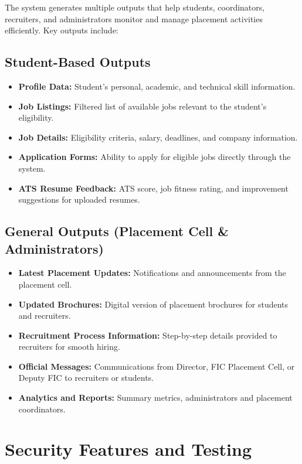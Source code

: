 \documentclass[14pt]{extarticle}
\begin{document}
The system generates multiple outputs that help students, coordinators, recruiters, and administrators monitor and manage placement activities efficiently. Key outputs include:

\subsection{Student-Based Outputs}
\begin{itemize}
    \item \textbf{Profile Data:} Student's personal, academic, and technical skill information.
    \item \textbf{Job Listings:} Filtered list of available jobs relevant to the student's eligibility.
    \item \textbf{Job Details:} Eligibility criteria, salary, deadlines, and company information.
    \item \textbf{Application Forms:} Ability to apply for eligible jobs directly through the system.
    \item \textbf{ATS Resume Feedback:} ATS score, job fitness rating, and improvement suggestions for uploaded resumes.
\end{itemize}

\subsection{General Outputs (Placement Cell \& Administrators)}
\begin{itemize}
    \item \textbf{Latest Placement Updates:} Notifications and announcements from the placement cell.
    \item \textbf{Updated Brochures:} Digital version of placement brochures for students and recruiters.
    \item \textbf{Recruitment Process Information:} Step-by-step details provided to recruiters for smooth hiring.
    \item \textbf{Official Messages:} Communications from Director, FIC Placement Cell, or Deputy FIC to recruiters or students.
    \item \textbf{Analytics and Reports:} Summary metrics,  administrators and placement coordinators.
\end{itemize}

\section{Security Features and Testing}
\end{document}
